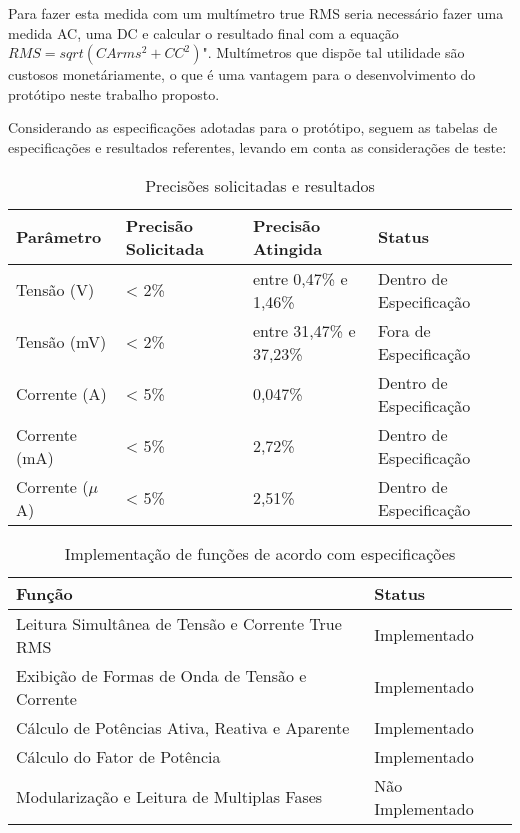 Para fazer esta medida com um multímetro true RMS seria necessário fazer uma medida AC, uma DC e calcular o resultado final com a equação $RMS=sqrt(CArms^2+CC^2)$". Multímetros que dispõe tal utilidade são custosos monetáriamente, o que é uma vantagem para o desenvolvimento do protótipo neste trabalho proposto. 

Considerando as especificações adotadas para o protótipo, seguem as tabelas de especificações e resultados referentes, levando em conta as considerações de teste:

\begin{table}[!ht]
    \centering
    \caption{Precisões solicitadas e resultados}
    \label{tab:resultados-precis}
    \begin{tabular}{|l|l|l|l|}
        \hline
        \textbf{Parâmetro} & \textbf{Precisão Solicitada} & \textbf{Precisão Atingida} & \textbf{Status}         \\ \hline
        Tensão (V)         & < 2\%                        & entre 0,47\% e 1,46\%      & Dentro de Especificação \\ \hline
        Tensão (mV)        & < 2\%                        & entre 31,47\% e 37,23\%    & Fora de Especificação   \\ \hline
        Corrente (A)       & < 5\%                        & 0,047\%                    & Dentro de Especificação \\ \hline
        Corrente (mA)      & < 5\%                        & 2,72\%                     & Dentro de Especificação  \\ \hline
        Corrente ($\mu$A)  & < 5\%                        & 2,51\%                     & Dentro de Especificação   \\ \hline
    \end{tabular}
    \fonte{}
\end{table}

\begin{table}[!ht]
    \centering
    \caption{Implementação de funções de acordo com especificações}
    \label{tab:resultados-func}
    \begin{tabular}{|l|l|}
        \hline
        \textbf{Função}                                  & \textbf{Status} \\ \hline
        Leitura Simultânea de Tensão e Corrente True RMS & Implementado  \\ \hline
        Exibição de Formas de Onda de Tensão e Corrente  & Implementado  \\ \hline
        Cálculo de Potências Ativa, Reativa e Aparente   & Implementado  \\ \hline
        Cálculo do Fator de Potência                     & Implementado  \\ \hline
        Modularização e Leitura de Multiplas Fases       & Não Implementado  \\ \hline
    \end{tabular}
    \fonte{}
\end{table}

